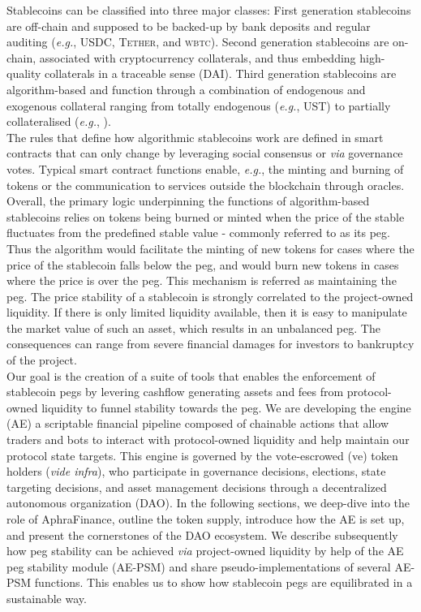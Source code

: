 Stablecoins can be classified into three major classes: First generation stablecoins are off-chain and supposed to be backed-up by bank deposits and regular auditing (\textit{e.g.}, \textsc{USDC},\cite{usdc} \textsc{Tether}\cite{tether}, and \textsc{wbtc}\cite{wbtc}).\cite{griffin2020}
Second generation stablecoins are on-chain, associated with cryptocurrency collaterals, and thus embedding high-quality collaterals in a traceable sense (\textsc{DAI}\cite{dai}).\cite{fatas2019}
Third generation stablecoins are algorithm-based and function through a combination of endogenous and exogenous collateral ranging from totally endogenous (\textit{e.g.}, \textsc{UST}\cite{ust}) to partially collateralised (\textit{e.g.}, \frax\cite{frax}).\\[-1em]

The rules that define how algorithmic stablecoins work are defined in smart contracts that can only change by leveraging social consensus or \textit{via} governance votes.
Typical smart contract functions enable, \textit{e.g.}, the minting and burning of tokens or the communication to services outside the blockchain through oracles.\cite{breidenbach2021}
Overall, the primary logic underpinning the functions of algorithm-based stablecoins relies on tokens being burned or minted when the price of the stable fluctuates from the predefined stable value - commonly referred to as its peg. Thus the algorithm would facilitate the minting of new tokens for cases where the price of the stablecoin falls below the peg, and would burn new tokens in cases where the price is over the peg. This mechanism is referred as maintaining the peg.
The price stability of a stablecoin is strongly correlated to the project-owned liquidity. 
If there is only limited liquidity available, then it is easy to manipulate the market value of such an asset, which results in an unbalanced peg.
The consequences can range from severe financial damages for investors to bankruptcy of the project.\\

Our goal is the creation of a suite of tools that enables the enforcement of stablecoin pegs by levering cashflow generating assets and fees from protocol-owned liquidity to funnel stability towards the peg.
We are developing the \aphra engine (AE) a scriptable financial pipeline composed of chainable actions that allow traders and bots to interact with protocol-owned liquidity and help maintain our protocol state targets.
This engine is governed by the vote-escrowed \aphra (ve\aphra) token holders (\textit{vide infra}), who participate in governance decisions, elections, state targeting decisions, and asset management decisions through a decentralized autonomous organization
(DAO).\cite{jentzsch2016}
In the following sections, we deep-dive into the role of AphraFinance, outline the \aphra token supply, introduce how the AE is set up, and present the cornerstones of the DAO ecosystem.
We describe subsequently how peg stability can be achieved \textit{via} project-owned liquidity by help of the AE peg stability module (AE-PSM) and share pseudo-implementations of several AE-PSM functions.
This enables us to show how stablecoin pegs are equilibrated in a sustainable way.
